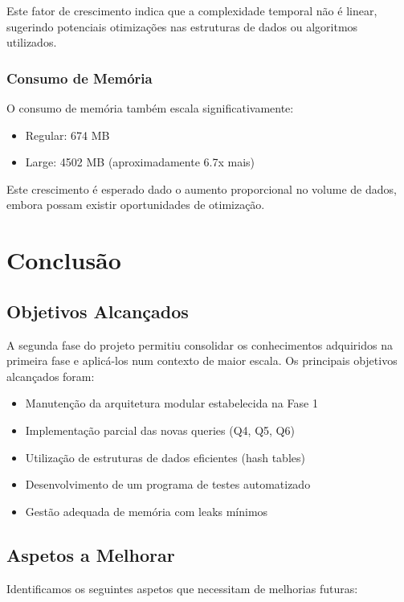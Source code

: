 \documentclass[a4paper,12pt]{scrreprt}
\begin{document}
Este fator de crescimento indica que a complexidade temporal não é linear, sugerindo potenciais otimizações nas estruturas de dados ou algoritmos utilizados.

\subsection{Consumo de Memória}

O consumo de memória também escala significativamente:
\begin{itemize}
    \item Regular: 674 MB
    \item Large: 4502 MB (aproximadamente 6.7x mais)
\end{itemize}

Este crescimento é esperado dado o aumento proporcional no volume de dados, embora possam existir oportunidades de otimização.


\chapter{Conclusão}

\section{Objetivos Alcançados}

A segunda fase do projeto permitiu consolidar os conhecimentos adquiridos na primeira fase e aplicá-los num contexto de maior escala. Os principais objetivos alcançados foram:

\begin{itemize}
    \item Manutenção da arquitetura modular estabelecida na Fase 1
    \item Implementação parcial das novas queries (Q4, Q5, Q6)
    \item Utilização de estruturas de dados eficientes (hash tables)
    \item Desenvolvimento de um programa de testes automatizado
    \item Gestão adequada de memória com leaks mínimos
\end{itemize}

\section{Aspetos a Melhorar}

Identificamos os seguintes aspetos que necessitam de melhorias futuras:
\end{document}
